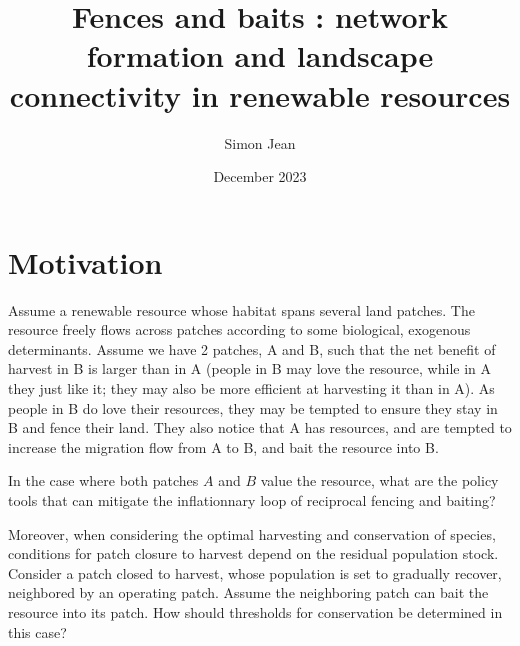 \documentclass{article}
\title{Fences and baits : network formation and landscape connectivity in renewable resources}
\author{Simon Jean}
\date{December 2023}
\begin{document}
\maketitle


\newpage

\section{Motivation}
Assume a renewable resource whose habitat spans several land patches. The resource freely flows across patches according to some biological, exogenous determinants.  Assume we have 2 patches, A and B, such that the net benefit of harvest in B is larger than in A (people in B may love the resource, while in A they just like it; they may also be more efficient at harvesting it than in A). As people in B do love their resources, they may be tempted to ensure they stay in B and fence their land. They also notice that A has resources, and are tempted to increase the migration flow from A to B, and bait the resource into B. 

In the case where both patches $A$ and $B$ value the resource, what are the policy tools that can mitigate the inflationnary loop of reciprocal fencing and baiting?

Moreover, when considering the optimal harvesting and conservation of species, conditions for patch closure to harvest depend on the residual population stock. Consider a patch closed to harvest, whose population is set to gradually recover, neighbored by an operating patch. Assume the neighboring patch can bait the resource into its patch. How should thresholds for conservation be determined in this case? 
\end{document}
